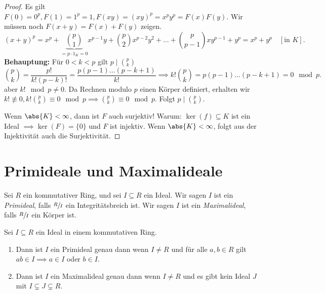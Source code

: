 \begin{proof}
	Es gilt $F(0) = 0^{p}, F(1) = 1^{p} = 1, F(xy) = (xy)^{p} = x^{p} y^{p} = F(x) F(y)$.
	Wir müssen noch $F(x+y) = F(x) + F(y)$ zeigen.
	\[
		(x+y)^{p} = x^{p} + \underbrace{\binom{p}{1}}_{=p\cdot 1_{K} = 0} x^{p-1} y + \binom{p}{2} x^{p-2} y^2 + \ldots + \binom{p}{p-1} x y^{p-1} + y^{p} = x^{p} + y^{p} 
		\quad [\text{in } K]
	.\] 
	\textbf{Behauptung:} Für $0 < k < p$ gilt $p \mid \binom{p}{k}$ 
	\[
		\binom{p}{k} = \frac{p!}{k! (p-k)!} = \frac{p (p-1) \ldots (p-k+1)}{k!} \implies k! \binom{p}{k} = p (p-1) \ldots (p-k+1) = 0 \mod p
	.\]
	aber $k! \mod p \neq 0$. Da Rechnen modulo $p$ einen Körper definiert, erhalten wir $k! \not\equiv 0, k! \binom{p}{k} \equiv 0 \mod p \implies \binom{p}{k} \equiv 0 \mod p$.
	Folgt $p \mid \binom{p}{k}$.

	Wenn $\abs{K} < \infty$, dann ist $F $ auch surjektiv!
	Warum: $\ker(f) \subseteq K$ ist ein Ideal $\implies \ker(F) = \{0\}$ und $F$ ist injektiv.
	Wenn $\abs{K} < \infty$, folgt aus der Injektivität auch die Surjektivität.
\end{proof}

\section{Primideale und Maximalideale}
\begin{definition}
	Sei $R$ ein kommutativer Ring, und sei $I \subseteq R$ ein Ideal.
	Wir sagen $I$ ist ein \emph{Primideal}, falls $\sfrac{R}{I}$ ein Integritätsbreich ist.
	Wir sagen $I$ ist ein \emph{Maximalideal}, falls $\sfrac{R}{I}$ ein Körper ist.
\end{definition}

\begin{proposition}
	Sei $I \subseteq R$ ein Ideal in einem kommutativen Ring.
	\begin{enumerate}[1)]
		\item Dann ist $I$ ein Primideal genau dann wenn $I \neq R$ und für alle $a,b \in R$ gilt $ab \in I \implies a \in I $ oder $b \in I$.
		\item Dann ist $I$ ein Maximalideal genau dann wenn $I \neq R$ und es gibt kein Ideal $J$ mit $I \subsetneq J \subsetneq R$.
	\end{enumerate}
\end{proposition}

